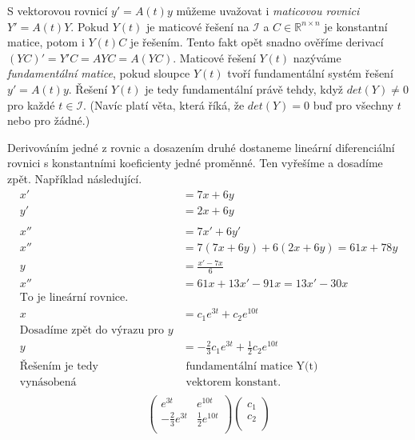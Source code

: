 S vektorovou rovnicí $y' = A(t) y$ můžeme uvažovat i
{\em maticovou rovnici} $Y' = A(t) Y$.
Pokud $Y(t)$ je maticové řešení na $\mathcal{I}$
a $C \in \mathbb{R}^{n \times n}$ je konstantní matice, potom
i $Y(t) C$ je řešením. Tento fakt opět snadno ověříme derivací
$(YC)' = Y'C = AYC = A(YC)$.
Maticové řešení $Y(t)$ nazýváme {\em fundamentální matice},
pokud sloupce $Y(t)$ tvoří fundamentální systém řešení $y' = A(t)y$.
Řešení $Y(t)$ je tedy fundamentální právě tehdy, když
$det(Y) \neq 0$ pro každé $t \in \mathcal{I}$. (Navíc platí věta, která
říká, že $det(Y) = 0$ buď pro všechny $t$ nebo pro žádné.)


\begin{example}
Derivováním jedné z rovnic a dosazením druhé dostaneme lineární
diferenciální rovnici s konstantními koeficienty jedné proměnné.
Ten vyřešíme a dosadíme zpět. Například následující.
\begin{align*}
    x' &= 7x + 6y \\
    y' &= 2x + 6y \\
    \\
    x'' &= 7x'+6y' \\
    x'' &= 7(7x+6y) + 6(2x+6y) = 61x+78y \\
    y   &= \frac{x' - 7x}{6} \\
    x'' &= 61x + 13x' - 91x = 13x' - 30x \\
    \text{To je lineární rovnice.} \\
    x &=  c_1 e^{3t} + c_2 e^{10t} \\
    \text{Dosadíme zpět do výrazu pro } y \\
    y &= -\frac{2}{3} c_1 e^{3t} + \frac{1}{2} c_2 e^{10t} \\
    \text{Řešením je tedy}& \text{ fundamentální matice Y(t)} \\
    \text{vynásobená}& \text{ vektorem konstant.} \\
\end{align*}
\vspace{-25pt}
\[
    \begin{pmatrix}
        e^{3t} & e^{10t} \\
        -\frac{2}{3}e^{3t} & \frac{1}{2} e^{10t} \\
    \end{pmatrix}
    \begin{pmatrix}
        c_1 \\
        c_2 \\
    \end{pmatrix}
\]
\end{example}


